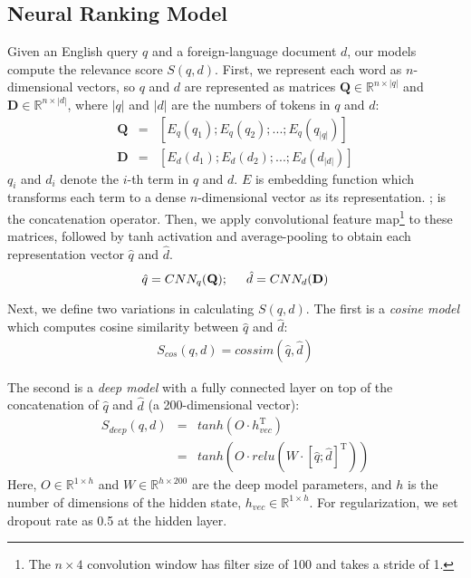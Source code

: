 \documentclass[11pt,a4paper]{article}
\begin{document}
%
\subsection{Neural Ranking Model}
\label{sec:model}
%
Given an English query $q$ and a foreign-language document $d$, our models compute the relevance score $S(q, d)$.
First, we represent each word as $n$-dimensional vectors, so $q$ and $d$ are represented as matrices $\mathbf{Q} \in \mathbb{R}^{n\times|q|}$  and $\mathbf{D} \in \mathbb{R}^{n\times|d|}$, where $|q|$ and $|d|$ are the numbers of tokens in $q$ and $d$:
%
\begin{eqnarray*}
	\mathbf{Q} &=& [E_q(q_1);E_q(q_2);...;E_q(q_{|q|})] \\
	\mathbf{D} &=& [E_d(d_1);E_d(d_2);...;E_d(d_{|d|})]
\end{eqnarray*}
%
$q_i$ and $d_i$ denote the $i$-th term in $q$ and $d$. 
$E$ is embedding function which transforms each term to a dense $n$-dimensional vector as its representation. ; is the concatenation operator.
Then, we apply convolutional feature map\footnote{The $n\times 4$ convolution window has filter size of 100 and takes a stride of 1.
} to these matrices, followed by tanh activation and average-pooling to obtain each representation vector $\hat{q}$ and $\hat{d}$.
%
\begin{equation}
\hat{q} = CNN_q(\mathbf{Q}); \hspace{5mm} \hat{d} = CNN_d(\mathbf{D})  
\end{equation}
%

Next, we define two variations in calculating $S(q, d)$.
The first is a \textit{cosine model} which computes cosine similarity between $\hat{q}$ and $\hat{d}$:
%
\begin{eqnarray}
\label{eq:cos}
S_{cos}(q, d) = cossim(\hat{q}, \hat{d})
 \end{eqnarray}

The second is a \textit{deep model} with a fully connected layer on top of the concatenation of $\hat{q}$ and $\hat{d}$ (a 200-dimensional vector):
\begin{eqnarray}
	\label{eq:deep}
	S_{deep}(q, d) &=& tanh(O\cdot h_{vec}^{\mathrm{T}}) \\ 
	&=& tanh(O \cdot relu(W \cdot [\hat{q};\hat{d}]^{\mathrm{T}})) \nonumber
\end{eqnarray}
%
%
Here, $ O \in \mathbb{R}^{1\times h}$ and $W\in \mathbb{R}^{h\times 200}$ are the deep model parameters, and $h$ is the number of dimensions of the hidden state, $h_{vec}\in \mathbb{R}^{1\times h}$.
For regularization, we set dropout rate as 0.5 \cite{nitish14dropout} at the hidden layer. 
\end{document}
